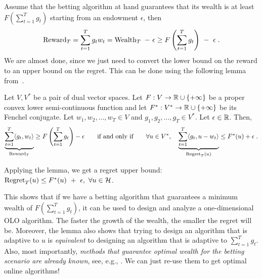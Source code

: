 Assume that the betting algorithm at hand guarantees that its wealth is at
least $F(\sum_{t=1}^T g_t)$ starting from an endowment $\epsilon$, then
\vspace{-.1cm}
\begin{equation}
\label{equation:one-dimensional-olo-reward-lower-bound}
\Reward_T
= \sum_{t=1}^T g_t w_t
= \Wealth_T \ - \ \epsilon \ge F\left(\sum_{t=1}^T g_t \right) \ - \ \epsilon \; .
\end{equation}
We are almost done, since we just need to convert the lower bound on the reward
to an upper bound on the regret. This can be done using the following lemma
from~\cite{McMahan-Orabona-2014}.
\begin{lemma}
\label{lemma:reward-regret}
Let $V,V^*$ be a pair of dual vector spaces. Let $F:V \to \mathbb{R} \cup \{+\infty\}$
be a proper convex lower semi-continuous function and let $F^*:V^* \to \mathbb{R} \cup
\{+\infty\}$ be its Fenchel conjugate. Let $w_1, w_2, \dots, w_T \in V$ and
$g_1, g_2, \dots, g_T \in V^*$. Let $\epsilon \in \mathbb{R}$. Then,
\[
\underbrace{\sum_{t=1}^T \langle g_t, w_t \rangle}_{\operatorname{Reward}_T} \ge F\left( \sum_{t=1}^T g_t \right) -\epsilon
\qquad \text{if and only if} \qquad
\forall u \in V^*, \quad
\underbrace{\sum_{t=1}^T \langle g_t, u - w_t\rangle}_{\operatorname{Regret}_T(u)} \le F^*(u) + \epsilon\; .
\]
\end{lemma}
\vspace{-.1cm}
Applying the lemma, we get a regret upper bound:
$\operatorname{Regret}_T(u) \le F^*(u) \ + \ \epsilon, \ \forall u \in \mathcal{H}$.


This shows that if we have a betting algorithm that guarantees a minimum wealth
of $F(\sum_{t=1}^T g_t)$, it can be used to design and analyze a
one-dimensional \ac{OLO} algorithm. The faster the growth of the wealth, the
smaller the regret will be.  Moreover, the lemma also shows that trying to
design an algorithm that is adaptive to $u$ is \emph{equivalent} to designing
an algorithm that is adaptive to $\sum_{t=1}^T g_t$.  Also, most importantly,
\emph{methods that guarantee optimal wealth for the betting scenario are
already known}, see, e.g., \cite[Chapter 9]{Cesa-Bianchi-Lugosi-2006}. We can
just re-use them to get optimal online algorithms!

